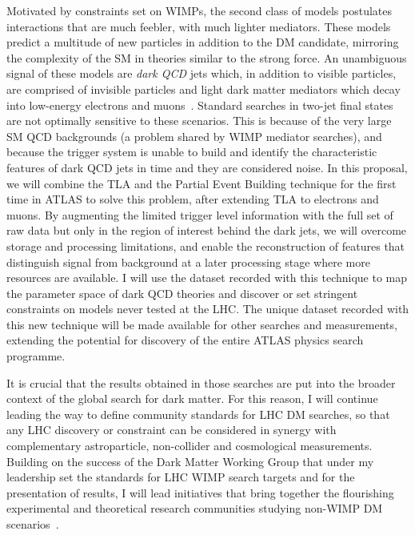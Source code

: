 \documentclass[11pt,a4paper]{article}
\begin{document}
Motivated by constraints set on WIMPs, the second class of models postulates interactions that are much feebler, with much lighter mediators. 
These models~\cite{Strassler:2006im,Cohen:2017pzm} predict a multitude of new particles in addition to the DM candidate, mirroring the complexity of the SM in theories similar to the strong force. 
An unambiguous signal of these models are \textit{dark QCD} jets which, in addition to visible particles, are comprised of invisible particles and light dark matter mediators which decay into low-energy electrons and muons~\cite{Curtin:2014cca}. 
Standard searches in two-jet final states are not optimally sensitive to these scenarios. %
This is because of the very large SM QCD backgrounds (a problem shared by WIMP mediator searches), and because the trigger system is unable to build and identify the characteristic features of dark QCD jets in time and they are considered noise. 
In this proposal, we will combine the TLA and the Partial Event Building technique for the first time in ATLAS to solve this problem, after extending TLA to electrons and muons. %
By augmenting the limited trigger level information with the full set of raw data but only in the region of interest behind the dark jets, we will overcome storage and processing limitations, and enable the reconstruction of features that distinguish signal from background at a later processing stage where more resources are available. 
I will use the dataset recorded with this technique to map the parameter space of dark QCD theories and discover or set stringent constraints on models never tested at the LHC. 
The unique dataset recorded with this new technique will be made available for other searches and measurements, extending the potential for discovery of the entire ATLAS physics search programme. 

It is crucial that the results obtained in those searches are put into the broader context of the global search for dark matter. 
For this reason, I will continue leading the way to define community standards for LHC DM searches, so that any LHC discovery or constraint can be considered %
in synergy with complementary astroparticle, non-collider and cosmological measurements. 
Building on the success of the Dark Matter Working Group that under my leadership set the standards for LHC WIMP search targets and for the presentation of results, I will lead initiatives that bring together the flourishing experimental and theoretical research communities studying non-WIMP DM scenarios~\cite{iDMEu}. 
\end{document}

